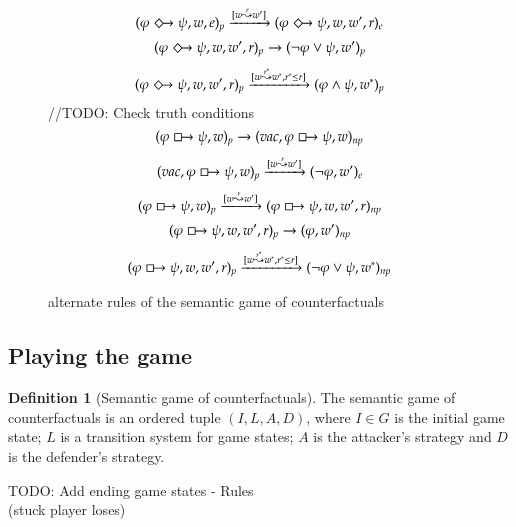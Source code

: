 \documentclass[a4paper,american]{paper}
\theoremstyle{definition}\newtheorem{definition}{Definition}
\begin{document}
\begin{figure}[H]
\begin{equation}
	\end{equation}
	\begin{equation}
		(\varphi\Diamondright\psi ,w,e)_p\xrightarrow{[w\overset{r}{\leadsto}w']}(\varphi\Diamondright\psi ,w,w',r)_{e}
	\end{equation}
	\begin{equation}
		(\varphi\Diamondright\psi ,w,w',r)_p\rightarrow (\neg\varphi\vee\psi ,w')_{p}
	\end{equation}
	\begin{equation}
		(\varphi\Diamondright\psi ,w,w',r)_p\xrightarrow{[w\overset{r^*}{\leadsto}w^*,r^*\leq r]}(\varphi\wedge\psi ,w^*)_{p}
	\end{equation}
	//TODO: Check truth conditions
	\begin{equation}
		(\varphi\boxright\psi ,w)_p\rightarrow (vac, \varphi\boxright\psi ,w)_{np}
	\end{equation}
	\begin{equation}
		(vac, \varphi\boxright\psi ,w)_p\xrightarrow{[w\overset{r}{\leadsto}w']}(\neg\varphi ,w')_{e}
	\end{equation}
	\begin{equation}
		(\varphi\boxright\psi ,w)_p\xrightarrow{[w\overset{r}{\leadsto}w']}(\varphi\boxright\psi ,w,w',r)_{np}
	\end{equation}
	\begin{equation}
		(\varphi\boxright\psi ,w,w',r)_p\rightarrow (\varphi ,w')_{np}
	\end{equation}
	\begin{equation}
		(\varphi\boxright\psi ,w,w',r)_p\xrightarrow{[w\overset{r^*}{\leadsto}w^*,r^*\leq r]}(\neg\varphi\vee\psi ,w^*)_{np}
	\end{equation}
	\caption{alternate rules of the semantic game of counterfactuals}
	\label{fig:rules}
\end{figure}
\subsection{Playing the game}
\begin{definition}[Semantic game of counterfactuals]
The semantic game of counterfactuals is an ordered tuple $(I, L, A, D)$, where $I\in G$ is the initial game state; $L$ is a transition system for game states; $A$ is the attacker's strategy and $D$ is the defender's strategy.
\end{definition}

TODO: Add ending game states
- Rules\\ (stuck player loses)
\end{document}
